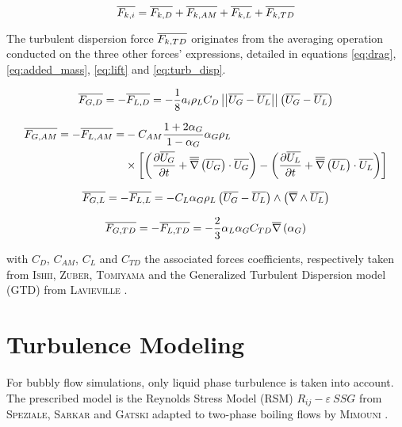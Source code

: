 \begin{equation}
\label{eq:force_balance}
\overline{F_{k,i}}=\overline{F_{k,D}} + \overline{F_{k,AM}} +\overline{F_{k,L}} +\overline{F_{k,TD}}
\end{equation}

The turbulent dispersion force $\overline{F_{k,TD}}$ originates from the averaging operation conducted on the three other forces' expressions, detailed in equations \ref{eq:drag}, \ref{eq:added_mass}, \ref{eq:lift} and \ref{eq:turb_disp}.


\begin{equation}
\label{eq:drag}
\overline{F_{G,D}}=-\overline{F_{L,D}}=-\frac{1}{8}a_{i}\rho_{L}C_{D}\left|\left|{ \overline{U_{G}}-\overline{U_{L}} }\right|\right|\left( \overline{U_{G}}-\overline{U_{L}}  \right)
\end{equation}

\begin{equation}
\label{eq:added_mass}
\begin{aligned}
\overline{F_{G,AM}}=-\overline{F_{L,AM}}=&-C_{AM} \frac{1+2\alpha_{G}}{1-\alpha_{G}}\alpha_{G}\rho_{L}\\
&\times \left[  \left( \frac{\partial{\overline{U_{G}}}}{\partial t}+\overline{\overline{\nabla}}\left({\overline{U_{G}}}\right)\cdot \overline{U_{G}}  \right) - \left( \frac{\partial{\overline{U_{L}}}}{\partial t}+\overline{\overline{\nabla}}\left({\overline{U_{L}}}\right)\cdot \overline{U_{L}}  \right)  \right]
\end{aligned}
\end{equation}

\begin{equation}
\label{eq:lift}
\overline{F_{G,L}}=-\overline{F_{L,L}}=-C_{L}\alpha_{G}\rho_{L}\left( \overline{U_{G}}-\overline{U_{L}}  \right)\wedge \left( \overline{\nabla}\wedge{\overline{U_{L}}}  \right)
\end{equation}

\begin{equation}
\label{eq:turb_disp}
\overline{F_{G,TD}}=-\overline{F_{L,TD}}=-\frac{2}{3}\alpha_{L}\alpha_{G}C_{TD}\overline{\nabla}\left({\alpha_{G}}\right)
\end{equation}

with $C_{D}$, $C_{AM}$, $C_{L}$ and $C_{TD}$ the associated forces coefficients, respectively taken from \textsc{Ishii}\cite{ishii1967}, \textsc{Zuber}\cite{zuber1964}, \textsc{Tomiyama}\cite{tomiyama2002} and the Generalized Turbulent Dispersion model (GTD) from \textsc{Lavieville} \etal \cite{lavieville2017}.

\section{Turbulence Modeling}
\label{subsec:turbulence}

For bubbly flow simulations, only liquid phase turbulence is taken into account. The prescribed model is the Reynolds Stress Model (RSM) $R_{ij}-\varepsilon~SSG$ from \textsc{Speziale}, \textsc{Sarkar} and \textsc{Gatski}\cite{speziale1991} adapted to two-phase boiling flows by \textsc{Mimouni} \etal\cite{mimouni2011}.


